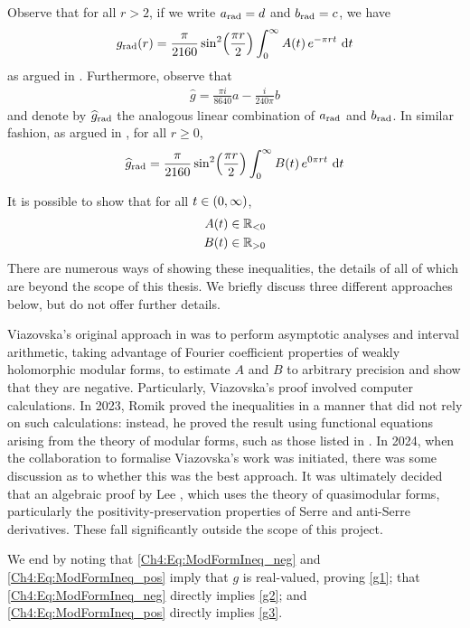 Observe that for all $r > 2$, if we write $a_{\operatorname{rad}} = d$ and $b_{\operatorname{rad}} = c$, we have
\begin{align*}
    g_{\operatorname{rad}}(r) = \frac{\pi}{2160} \sin^2\!\left( \frac{\pi r}{2} \right) \int_{0}^{\infty} A(t) \, e^{- \pi r t} \, \operatorname{d}\!{t}
\end{align*}
as argued in . Furthermore, observe that
\begin{align}
    \hat{g} = \frac{\pi i}{8640} a - \frac{i}{240\pi} b
\end{align}
and denote by $\widehat{g}_{\operatorname{rad}}$ the analogous linear combination of $a_{\operatorname{rad}}$ and $b_{\operatorname{rad}}$. In similar fashion, as argued in , for all $r \geq 0$,
\begin{align}
    \widehat{g}_{\operatorname{rad}} = \frac{\pi}{2160} \sin^2\!\left( \frac{\pi r}{2} \right) \int_{0}^{\infty} B(t) \, e^{0\pi r t} \, \operatorname{d}\!{t}
\end{align}

It is possible to show that for all $t \in \left( 0, \infty \right)$,
\begin{align}
    A(t) &\in \mathbb{R}_{< 0} \label{Ch4:Eq:ModFormIneq_neg} \\
    B(t) &\in \mathbb{R}_{> 0} \label{Ch4:Eq:ModFormIneq_pos}
\end{align}
There are numerous ways of showing these inequalities, the details of all of which are beyond the scope of this thesis. We briefly discuss three different approaches below, but do not offer further details.

Viazovska's original approach in \cite{Viazovska8} was to perform asymptotic analyses and interval arithmetic, taking advantage of Fourier coefficient properties of weakly holomorphic modular forms, to estimate $A$ and $B$ to arbitrary precision and show that they are negative. Particularly, Viazovska's proof involved computer calculations. In 2023, Romik \cite{Romik_Ineq} proved the inequalities in a manner that did not rely on such calculations: instead, he proved the result using functional equations arising from the theory of modular forms, such as those listed in . In 2024, when the collaboration to formalise Viazovska's work was initiated, there was some discussion as to whether this was the best approach. It was ultimately decided that an algebraic proof by Lee \cite{Seewoo_Ineq}, which uses the theory of quasimodular forms, particularly the positivity-preservation properties of Serre and anti-Serre derivatives. These fall significantly outside the scope of this project.

We end by noting that \eqref{Ch4:Eq:ModFormIneq_neg} and \eqref{Ch4:Eq:ModFormIneq_pos} imply that $g$ is real-valued, proving \ref{g1}; that \eqref{Ch4:Eq:ModFormIneq_neg} directly implies \ref{g2}; and \eqref{Ch4:Eq:ModFormIneq_pos} directly implies \ref{g3}.

